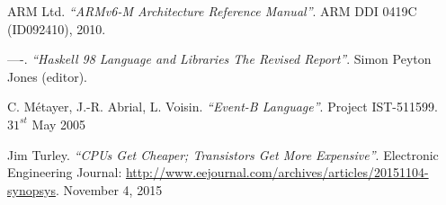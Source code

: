 \documentclass[conference]{IEEEtran}
\begin{document}
\begin{thebibliography}{1}
	ARM Ltd. \emph{``ARMv6-M Architecture Reference Manual''}. 
	ARM DDI 0419C (ID092410), 2010.
	
	----. \emph{``Haskell 98 Language and Libraries The Revised Report''}. 
	Simon Peyton Jones (editor).
	
	C. Métayer, J.-R. Abrial, L. Voisin. \emph{``Event-B Language''}. 
	Project IST-511599. $31^{st}$ May 2005
	
	Jim Turley. \emph{``CPUs Get Cheaper; Transistors Get More Expensive''}. Electronic
	Engineering Journal: \url{http://www.eejournal.com/archives/articles/20151104-synopsys}.
	November 4, 2015
	
\end{thebibliography}
\end{document}
